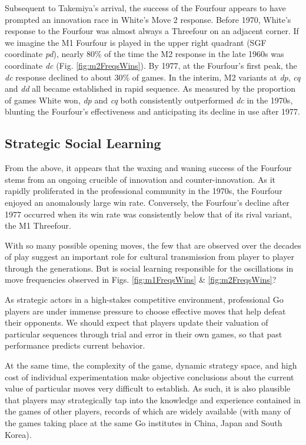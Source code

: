 \documentclass[reqno,12pt]{amsart}
\begin{document}
Subsequent to Takemiya's arrival, the success of the Fourfour appears to have prompted an innovation race in White's Move 2 response. Before 1970, White's response to the Fourfour was almost always a Threefour on an adjacent corner. If we imagine the M1 Fourfour is played in the upper right quadrant (SGF coordinate \textit{pd}), nearly 80\% of the time the M2 response in the late 1960s was coordinate \textit{dc} (Fig. \ref{fig:m2FreqsWins}). By 1977, at the Fourfour's first peak, the \textit{dc} response declined to about 30\% of games. In the interim, M2 variants at \textit{dp}, \textit{cq} and \textit{dd} all became established in rapid sequence. As measured by the proportion of games White won, \textit{dp} and \textit{cq} both consistently outperformed \textit{dc} in the 1970s, blunting the Fourfour's effectiveness and anticipating its decline in use after 1977.

\subsection{Strategic Social Learning}

From the above, it appears that the waxing and waning success of the Fourfour stems from an ongoing crucible of innovation and counter-innovation. As it rapidly proliferated in the professional community in the 1970s, the Fourfour enjoyed an anomalously large win rate. Conversely, the Fourfour's decline after 1977 occurred when its win rate was consistently below that of its rival variant, the M1 Threefour.

With so many possible opening moves, the few that are observed over the decades of play suggest an important role for cultural transmission from player to player through the generations. But is social learning responsible for the oscillations in move frequencies observed in Figs. \ref{fig:m1FreqsWins} \& \ref{fig:m2FreqsWins}?

As strategic actors in a high-stakes competitive environment, professional Go players are under immense pressure to choose effective moves that help defeat their opponents. We should expect that players update their valuation of particular sequences through trial and error in their own games, so that past performance predicts current behavior.

At the same time, the complexity of the game, dynamic strategy space, and high cost of individual experimentation make objective conclusions about the current value of particular moves very difficult to establish. As such, it is also plausible that players may strategically tap into the knowledge and experience contained in the games of other players, records of which are widely available (with many of the games taking place at the same Go institutes in China, Japan and South Korea).
\end{document}
